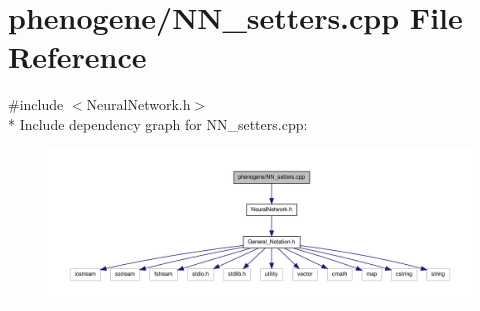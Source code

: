 \hypertarget{a00018}{\section{phenogene/\-N\-N\-\_\-setters.cpp File Reference}
\label{d1/d2b/a00018}
}
{\ttfamily \#include $<$Neural\-Network.\-h$>$}\\*
Include dependency graph for N\-N\-\_\-setters.\-cpp\-:
\nopagebreak
\begin{figure}[H]
\begin{center}
\leavevmode
\includegraphics[width=350pt]{d3/de7/a00039}
\end{center}
\end{figure}
